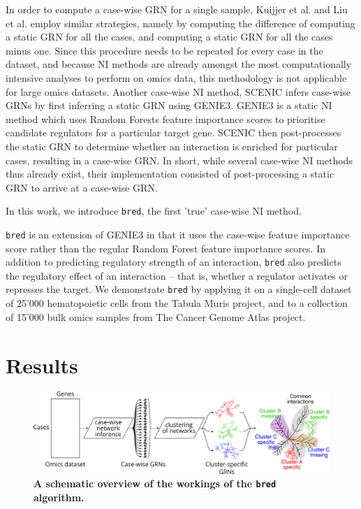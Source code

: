 In order to compute a case-wise GRN for a single sample, Kuijjer et al.\cite{kuijjer_estimatingsamplespecificregulatory_2019} and Liu et al.\cite{liu_personalizedcharacterizationdiseases_2016} employ similar strategies, namely by computing the difference of computing a static GRN for all the cases, and computing a static GRN for all the cases minus one. Since this procedure needs to be repeated for every case in the dataset, and because NI methods are already amongst the most computationally intensive analyses to perform on omics data, this methodology is not applicable for large omics datasets.
Another case-wise NI method, SCENIC\cite{aibar_scenicsinglecellregulatory_2017} infers case-wise GRNs by first inferring a static GRN using GENIE3\cite{huynh-thu_inferringregulatorynetworks_2010}. GENIE3 is a static NI method which uses Random Forests\cite{breiman_randomforests_2001} feature importance scores to prioritise candidate regulators for a particular target gene. SCENIC then post-processes the static GRN to determine whether an interaction is enriched for particular cases, resulting in a case-wise GRN. 
In short, while several case-wise NI methods thus already exist, their implementation consisted of post-processing a static GRN to arrive at a case-wise GRN. 

In this work, we introduce \texttt{bred}, the first 'true' case-wise NI method. 

\texttt{bred} is an extension of GENIE3\cite{huynh-thu_inferringregulatorynetworks_2010} in that it uses the case-wise feature importance\cite{xu_casespecificrandomforests_2016} score rather than the regular Random Forest feature importance scores. In addition to predicting regulatory strength of an interaction, \texttt{bred} also predicts the regulatory effect of an interaction -- that is, whether a regulator activates or represses the target.
We demonstrate \texttt{bred} by applying it on a single-cell dataset of 25'000 hematopoietic cells from the Tabula Muris project\cite{schaum_singlecelltranscriptomics20_2018}, and to a collection of 15'000 bulk omics samples from The Cancer Genome Atlas project\cite{weinstein_cancergenomeatlas_2013}.


\section{Results}


\begin{figure}[htb!]
	\centering
	\includegraphics[width=\linewidth]{fig/example.pdf} 
	\caption{
		\textbf{A schematic overview of the workings of the \texttt{bred} algorithm.}
	}
	\label{fig:example_cni}
\end{figure}

